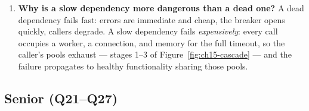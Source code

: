 \begin{enumerate}[label=\textbf{Q\arabic*.}, leftmargin=1.6cm, start=11]
        \texttt{Retry-After}), bounded queues that fail fast when full, and
        credit-based flow control (HTTP/2 stream windows, gRPC). Unbounded
        queues are not backpressure; they are delayed failure.
  \item \textbf{Why is a slow dependency more dangerous than a dead one?}
        A dead dependency fails fast: errors are immediate and cheap, the
        breaker opens quickly, callers degrade. A slow dependency fails
        \emph{expensively}: every call occupies a worker, a connection, and
        memory for the full timeout, so the caller's pools exhaust ---
        stages 1--3 of Figure~\ref{fig:ch15-cascade} --- and the failure
        propagates to healthy functionality sharing those pools.
\end{enumerate}

\subsection*{Senior (Q21--Q27)}
